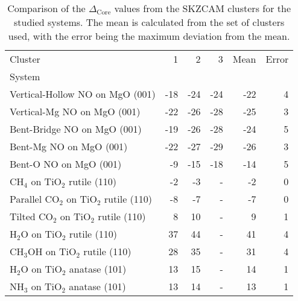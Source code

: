 \begin{table}
\caption{\label{tab:deltacore}Comparison of the $\Delta_\textrm{Core}$ values from the SKZCAM clusters for the studied systems. The mean is calculated from the set of clusters used, with the error being the maximum deviation from the mean.}
\begin{adjustbox}{center,max width=1\textwidth}
\begin{tabular}{lrrrrr}
\toprule
Cluster & 1 & 2 & 3 & Mean & Error \\ 
System &  &  &  &  &  \\
\midrule
Vertical-Hollow NO on MgO (001) & -18 & -24 & -24 & -22 & 4 \\
Vertical-Mg NO on MgO (001) & -22 & -26 & -28 & -25 & 3 \\
Bent-Bridge NO on MgO (001) & -19 & -26 & -28 & -24 & 5 \\
Bent-Mg NO on MgO (001) & -22 & -27 & -29 & -26 & 3 \\
Bent-O NO on MgO (001) & -9 & -15 & -18 & -14 & 5 \\
CH$_4$ on TiO$_2$ rutile (110) & -2 & -3 & - & -2 & 0 \\
Parallel CO$_2$ on TiO$_2$ rutile (110) & -8 & -7 & - & -7 & 0 \\
Tilted CO$_2$ on TiO$_2$ rutile (110) & 8 & 10 & - & 9 & 1 \\
H$_2$O on TiO$_2$ rutile (110) & 37 & 44 & - & 41 & 4 \\
CH$_3$OH on TiO$_2$ rutile (110) & 28 & 35 & - & 31 & 4 \\
H$_2$O on TiO$_2$ anatase (101) & 13 & 15 & - & 14 & 1 \\
NH$_3$ on TiO$_2$ anatase (101) & 13 & 14 & - & 13 & 1 \\
\bottomrule
\end{tabular}
\end{adjustbox}
\end{table}